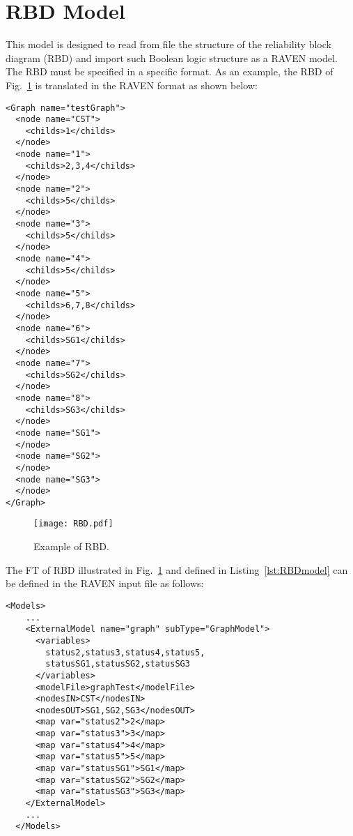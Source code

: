 \section{RBD Model}
\label{sec:RBDmodel}

This model is designed to read from file the structure of the reliability block diagram (RBD) and import such Boolean logic structure as a RAVEN model.
The RBD must be specified in a specific format. As an example, the RBD of Fig.~\ref{fig:RBD} is translated in the RAVEN format as shown below:

\begin{lstlisting}[style=XML,morekeywords={anAttribute},caption=RBD input file., label=lst:RBDmodel]
<Graph name="testGraph">
  <node name="CST">
    <childs>1</childs>
  </node>
  <node name="1">
    <childs>2,3,4</childs>
  </node>
  <node name="2">
    <childs>5</childs>
  </node>
  <node name="3">
    <childs>5</childs>
  </node>
  <node name="4">
    <childs>5</childs>
  </node>
  <node name="5">
    <childs>6,7,8</childs>
  </node>
  <node name="6">
    <childs>SG1</childs>
  </node>
  <node name="7">
    <childs>SG2</childs>
  </node>
  <node name="8">
    <childs>SG3</childs>
  </node>
  <node name="SG1">
  </node>
  <node name="SG2">
  </node>
  <node name="SG3">
  </node>
</Graph>
\end{lstlisting}

\begin{figure}
    \centering
    \centerline{\texttt{[image: RBD.pdf]}}
    \caption{Example of RBD.}
    \label{fig:RBD}
\end{figure}

The FT of RBD illustrated in Fig.~\ref{fig:RBD} and defined in Listing~\ref{lst:RBDmodel} can be defined in the RAVEN input file as follows:

\begin{lstlisting}[style=XML,morekeywords={anAttribute},caption=RBD model input example., label=lst:RBD_InputExample]
  <Models>
    ...
    <ExternalModel name="graph" subType="GraphModel">
      <variables>
        status2,status3,status4,status5,
        statusSG1,statusSG2,statusSG3
      </variables>
      <modelFile>graphTest</modelFile>
      <nodesIN>CST</nodesIN>
      <nodesOUT>SG1,SG2,SG3</nodesOUT>
      <map var="status2">2</map>
      <map var="status3">3</map>
      <map var="status4">4</map>
      <map var="status5">5</map>
      <map var="statusSG1">SG1</map>
      <map var="statusSG2">SG2</map>
      <map var="statusSG3">SG3</map>
    </ExternalModel>
    ...
  </Models>
\end{lstlisting}

